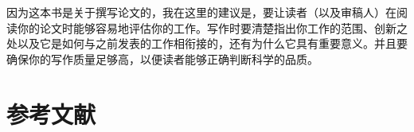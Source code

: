 因为这本书是关于撰写论文的，我在这里的建议是，要让读者（以及审稿人）在阅读你的论文时能够容易地评估你的工作。写作时要清楚指出你工作的范围、创新之处以及它是如何与之前发表的工作相衔接的，还有为什么它具有重要意义。并且要确保你的写作质量足够高，以便读者能够正确判断科学的品质。

\section*{参考文献}

